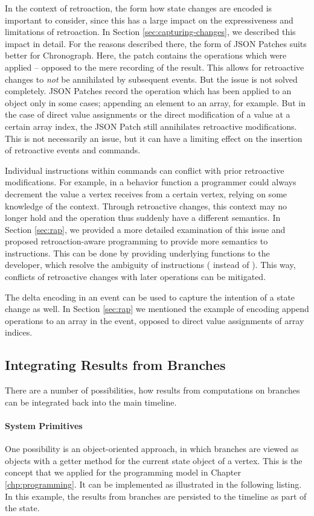 In the context of retroaction, the form how state changes are encoded is 
important to consider, since this has a large impact on the expressiveness 
and limitations of retroaction. 
In Section \ref{sec:capturing-changes}, we described this impact in detail.
For the reasons described there, the form of JSON Patches suits better for 
Chronograph. Here, the patch contains the operations which were applied -- 
opposed to the mere recording of the result. This allows for retroactive 
changes to \emph{not} be annihilated by subsequent events.
But the issue is not solved completely. JSON Patches record the operation 
which has been applied to an object only in some cases; appending an element
to an array, for example. But in the case of direct value assignments or the 
direct modification of a value at a certain array index, the JSON Patch still 
annihilates retroactive modifications. This is not necessarily an issue, 
but it can have a limiting effect on the insertion of retroactive events and 
commands.

Individual instructions within commands can conflict with prior retroactive 
modifications. For example, in a behavior function a programmer could always 
decrement the value a vertex receives from a certain vertex, relying on some 
knowledge of the context. 
Through retroactive changes, this context may no longer hold and the operation 
thus suddenly have a different semantics.
In Section \ref{sec:rap}, we provided a more detailed examination of this
issue and proposed retroaction-aware programming to provide more semantics to 
instructions. 
This can be done by providing underlying functions to the developer, which 
resolve the ambiguity of instructions ( instead of 
). This way, conflicts of retroactive changes with later 
operations can be mitigated.

The delta encoding in an event can be used to capture the intention of a state 
change as well. In Section \ref{sec:rap} we mentioned the example of encoding 
append operations to an array in the event, opposed to direct value assignments 
of array indices.

\subsection{Integrating Results from Branches}
There are a number of possibilities, how results from computations on branches can 
be integrated back into the main timeline.

\paragraph{System Primitives}
One possibility is an object-oriented approach, in which branches are viewed as 
objects with a getter method for the current state object of a vertex. This is 
the concept that we applied for the programming model in Chapter \ref{chp:programming}.
It can be implemented as illustrated in the following listing. In this example, 
the results from branches are persisted to the timeline as part of the state.

